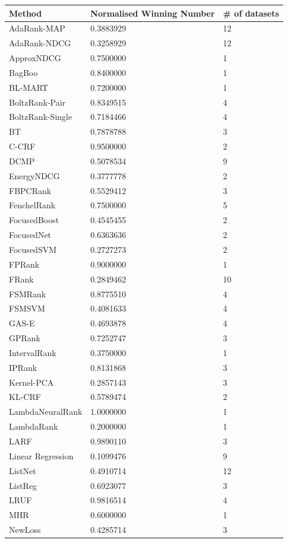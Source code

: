 \documentclass{sig-alternate-2013}
\begin{document}
\begin{table}
\begin{tabular}{l|l|l}
Method & Normalised Winning Number & \# of datasets \\
\hline
AdaRank-MAP & 0.3883929 & 12 \\ 
AdaRank-NDCG & 0.3258929 & 12 \\ 
ApproxNDCG & 0.7500000 & 1 \\ 
BagBoo & 0.8400000 & 1 \\ 
BL-MART & 0.7200000 & 1 \\ 
BoltzRank-Pair & 0.8349515 & 4 \\ 
BoltzRank-Single & 0.7184466 & 4 \\ 
BT & 0.7878788 & 3 \\ 
C-CRF & 0.9500000 & 2 \\ 
DCMP & 0.5078534 & 9 \\ 
EnergyNDCG & 0.3777778 & 2 \\ 
FBPCRank & 0.5529412 & 3 \\ 
FenchelRank & 0.7500000 & 5 \\ 
FocusedBoost & 0.4545455 & 2 \\ 
FocusedNet & 0.6363636 & 2 \\ 
FocusedSVM & 0.2727273 & 2 \\ 
FPRank & 0.9000000 & 1 \\ 
FRank & 0.2849462 & 10 \\ 
FSMRank & 0.8775510 & 4 \\ 
FSMSVM & 0.4081633 & 4 \\ 
GAS-E & 0.4693878 & 4 \\ 
GPRank & 0.7252747 & 3 \\ 
IntervalRank & 0.3750000 & 1 \\ 
IPRank & 0.8131868 & 3 \\ 
Kernel-PCA & 0.2857143 & 3 \\ 
KL-CRF & 0.5789474 & 2 \\ 
LambdaNeuralRank & 1.0000000 & 1 \\ 
LambdaRank & 0.2000000 & 1 \\ 
LARF & 0.9890110 & 3 \\ 
Linear Regression & 0.1099476 & 9 \\ 
ListNet & 0.4910714 & 12 \\ 
ListReg & 0.6923077 & 3 \\ 
LRUF & 0.9816514 & 4 \\ 
MHR & 0.6000000 & 1 \\ 
NewLoss & 0.4285714 & 3 \\ 

\end{tabular}
\end{table}
\end{document}
